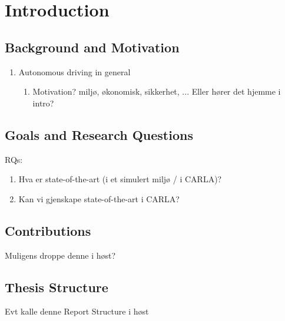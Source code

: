 \chapter{Introduction}

\section{Background and Motivation}

\begin{enumerate}
    \item Autonomous driving in general
    \begin{enumerate}
        \item Motivation? miljø, økonomisk, sikkerhet, ... Eller hører det hjemme i intro?
    \end{enumerate}
\end{enumerate}


\section{Goals and Research Questions}

RQs:
\begin{enumerate}
    \item Hva er state-of-the-art (i et simulert miljø / i CARLA)?
    \item Kan vi gjenskape state-of-the-art i CARLA?
\end{enumerate}


\section{Contributions}
Muligens droppe denne i høst?

\section{Thesis Structure}
Evt kalle denne Report Structure i høst
